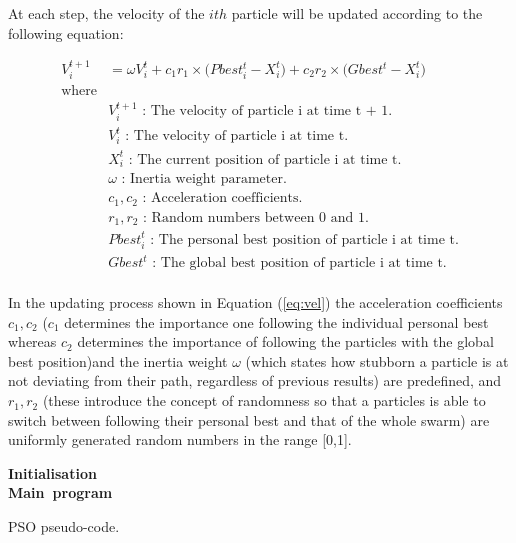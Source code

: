 \documentclass{pdfmx4020}
\begin{document}
    At each step, the velocity of the $ith$ particle will be updated according to the following equation:

    \begin{equation} \label{eq:vel}
      \begin{split}
        V_{i}^{t+1} & = \omega V_{i}^{t} + c_1 r_1 \times \Big( Pbest_{i}^{t} - X_{i}^{t} \Big) + c_2 r_2 \times \Big( Gbest^{t} - X_{i}^{t} \Big) \\
        \text{where} & \\
        & V_i^{t+1} \text{ : The velocity of particle i at time t + 1.} \\
        & V_i^t \text{ : The velocity of particle i at time t.} \\
        & X_i^t \text{ : The current position of particle i at time t.} \\
        & \omega \text{ : Inertia weight parameter.} \\
        & c_1, c_2 \text{ : Acceleration coefficients.} \\
        & r_1, r_2 \text{ : Random numbers between 0 and 1.} \\
        & Pbest_i^t \text{ : The personal best position of particle i at time t.} \\
        & Gbest^t \text{ : The global best position of particle i at time t.} \\
      \end{split}
    \end{equation}

  In the updating process shown in Equation (\ref{eq:vel}) the acceleration coefficients $c_1, c_2$ ($c_1$ determines the importance one following the individual personal best whereas $c_2$ determines the importance of following the particles with the global best position)and the inertia weight $\omega$ (which states how stubborn a particle is at not deviating from their path, regardless of previous results) are predefined, and $r_1, r_2$ (these introduce the concept of randomness so that a particles is able to switch between following their personal best and that of the whole swarm) are uniformly generated random numbers in the range [0,1].

    \begin{algorithm}[H] \label{eq:pso}
      \mbox{\textbf{Initialisation}} \\
      \mbox{\textbf{Main program}} \\      
      \caption{PSO pseudo-code.}
    \end{algorithm}
  
\end{document}
